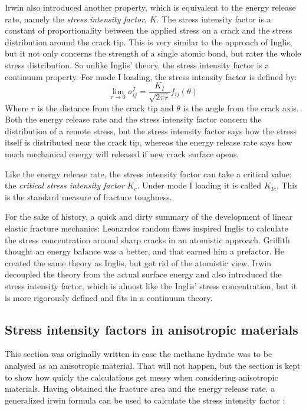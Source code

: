 Irwin also introduced another property, which is equivalent to the energy release rate, namely the \emph{stress intensity factor}, $K$. The stress intensity factor is a constant of proportionality between the applied stress on a crack and the stress distribution around the crack tip. This is very similar to the approach of Inglis, but it not only concerns the strength of a single atomic bond, but rater the whole stress distribution. So unlike Inglis' theory, the stress intensity factor is a continuum property. For mode I loading, the stress intensity factor is defined by:
\begin{equation}
	\lim_{r \to 0} \sigma_{ij}^I = \frac{K_I}{\sqrt{2\pi r}} f_{ij}(\theta)
\end{equation}
Where $r$ is the distance from the crack tip and $\theta$ is the angle from the crack axis. Both the energy release rate and the stress intensity factor concern the distribution of a remote stress, but the stress intensity factor says how the stress itself is distributed near the crack tip, whereas the energy release rate says how much mechanical energy will released if new crack surface opens. 

Like the energy release rate, the stress intensity factor can take a critical value; the \emph{critical stress intensity factor} $K_c$. Under mode I loading it is called $K_{Ic}$. This is the standard measure of fracture toughness.

For the sake of history, a quick and dirty summary of the development of linear elastic fracture mechanics: Leonardos random flaws inspired Inglis to calculate the stress concentration around sharp cracks in an atomistic approach. Griffith thought an energy balance was a better, and that earned him a prefactor. He created the same theory as Inglis, but got rid of the atomistic view. Irwin decoupled the theory from the actual surface energy and also introduced the stress intensity factor, which is almost like the Inglis' stress concentration, but it is more rigorously defined and fits in a continuum theory.

\subsection{Stress intensity factors in anisotropic materials}
This section was originally written in case the methane hydrate was to be analysed as an anisotropic material. That will not happen, but the section is kept to show how quicly the calculations get messy when considering anisotropic materials. Having obtained the fracture area and the energy release rate. a generalized irwin formula can be used to calculate the stress intensity factor \cite{Laubie2014}:

